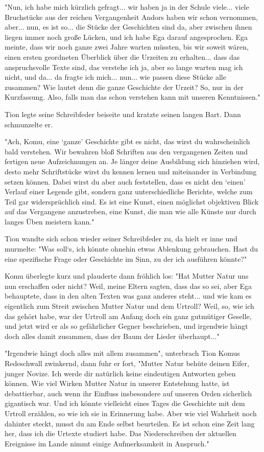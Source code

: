 "Nun, ich habe mich kürzlich gefragt... wir haben ja in der Schule viele... viele Bruchstücke aus der reichen Vergangenheit Andors haben wir schon vernommen, aber... nun, es ist so... die Stücke der Geschichten sind da, aber zwischen ihnen liegen immer noch große Lücken, und ich habe Ega darauf angesprochen. Ega meinte, dass wir noch ganze zwei Jahre warten müssten, bis wir soweit wären, einen ersten geordneten Überblick über die Urzeiten zu erhalten... dass das anspruchsvolle Texte sind, das verstehe ich ja, aber so lange warten mag ich nicht, und da... da fragte ich mich... nun... wie passen diese Stücke alle zusammen? Wie lautet denn die ganze Geschichte der Urzeit? So, nur in der Kurzfassung. Also, falls man das schon verstehen kann mit unseren Kenntnissen."

Tion legte seine Schreibfeder beiseite und kratzte seinen langen Bart. Dann schmunzelte er.

"Ach, Komu, eine ‘ganze’ Geschichte gibt es nicht, das wirst du wahrscheinlich bald verstehen. Wir bewahren bloß Schriften aus den vergangenen Zeiten und fertigen neue Aufzeichnungen an. Je länger deine Ausbildung sich hinziehen wird, desto mehr Schriftstücke wirst du kennen lernen und miteinander in Verbindung setzen können. Dabei wirst du aber auch feststellen, dass es nicht den ‘einen’ Verlauf einer Legende gibt, sondern ganz unterschiedliche Berichte, welche zum Teil gar widersprüchlich sind. Es ist eine Kunst, einen möglichst objektiven Blick auf das Vergangene anzustreben, eine Kunst, die man wie alle Künste nur durch langes Üben meistern kann."

Tion wandte sich schon wieder seiner Schreibfeder zu, da hielt er inne und murmelte: "Was soll‘s, ich könnte ohnehin etwas Ablenkung gebrauchen. Hast du eine spezifische Frage oder Geschichte im Sinn, zu der ich ausführen könnte?"

Komu überlegte kurz und plauderte dann fröhlich los: "Hat Mutter Natur uns nun erschaffen oder nicht? Weil, meine Eltern sagten, dass das so sei, aber Ega behauptete, dass in den alten Texten was ganz anderes steht... und wie kam es eigentlich zum Streit zwischen Mutter Natur und dem Urtroll? Weil, so, wie ich das gehört habe, war der Urtroll am Anfang doch ein ganz gutmütiger Geselle, und jetzt wird er als so gefährlicher Gegner beschrieben, und irgendwie hängt doch alles damit zusammen, dass der Baum der Lieder überhaupt..."

"Irgendwie hängt doch alles mit allem zusammen", unterbrach Tion Komus Redeschwall zwinkernd, dann fuhr er fort, "Mutter Natur behüte deinen Eifer, junger Novize. Ich werde dir natürlich keine eindeutigen Antworten geben können. Wie viel Wirken Mutter Natur in unserer Entstehung hatte, ist debattierbar, auch wenn ihr Einfluss insbesondere auf unseren Orden sicherlich gigantisch war. Und ich könnte vielleicht eines Tages die Geschichte mit dem Urtroll erzählen, so wie ich sie in Erinnerung habe. Aber wie viel Wahrheit noch dahinter steckt, musst du am Ende selbst beurteilen. Es ist schon eine Zeit lang her, dass ich die Urtexte studiert habe. Das Niederschreiben der aktuellen Ereignisse im Lande nimmt einige Aufmerksamkeit in Anspruch."

